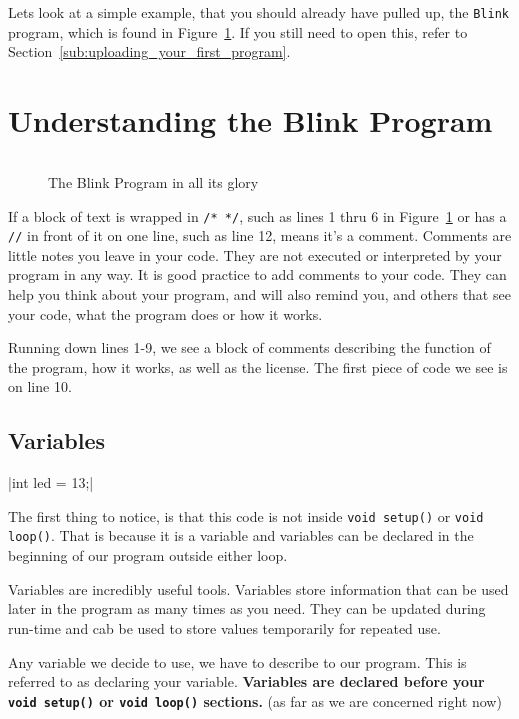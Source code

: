 \documentclass[11pt,a4paper]{article}
\begin{document}
Lets look at a simple example, that you should already have pulled up, the \texttt{Blink} program, which is found in Figure~\ref{fig:blink}.  If you still need to open this, refer to Section~\ref{sub:uploading_your_first_program}.



\section{Understanding the Blink Program} %
\label{sec:understanding_the_blink_program}

\begin{figure}[htbp]
	\centering
\inputminted[mathescape,linenos,numbersep=5pt,gobble=0,frame=lines,framesep=2mm]{c}{code/blink/blink.ino}
	\caption{The Blink Program in all its glory}
	\label{fig:blink}
\end{figure}

If a block of text is wrapped in \texttt{/* */}, such as lines 1 thru 6 in Figure~\ref{fig:blink} or has a \texttt{//} in front of it on one line, such as line 12, means it's a comment.  Comments are little notes you leave in your code.   They are not executed or interpreted by your program in any way.  It is good practice to add comments to your code.  They can help you think about your program, and will also remind you, and others that see your code, what the program does or how it works.

Running down lines 1-9, we see a block of comments describing the function of the program, how it works, as well as the license.   The first piece of code we see is on line 10.


\subsection{Variables} %
\label{sub:variables}

|int led = 13;|

The first thing to notice, is that this code is not inside \texttt{void setup()} or \texttt{void loop()}.  That is because it is a variable and variables can be declared in the beginning of our program outside either loop. 

Variables are incredibly useful tools.  Variables store information that can be used later in the program as many times as you need.  They can be updated during run-time and cab be used to store values temporarily for repeated use.

Any variable we decide to use, we have to describe to our program.  This is referred to as declaring your variable.  \textbf{Variables are declared before your \texttt{void setup()} or \texttt{void loop()} sections.} (as far as we are concerned  right now)    
\end{document}
